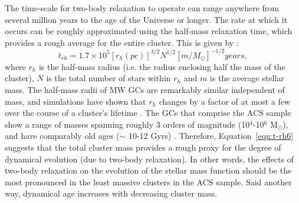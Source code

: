 The time-scale for two-body relaxation to operate can range anywhere from
several million years to the age of the Universe or longer.  The rate
at which it occurs can be roughly approximated using the half-mass
relaxation time, which provides a rough average for the entire
cluster.  This is given by \citep{spitzer87}:  
\begin{equation}
\label{eqn:t-rh6}
t_{rh} = 1.7 \times 10^5[r_h(pc)]^{3/2}N^{1/2}[m/M_{\odot}]^{-1/2}
years,
\end{equation}
where $r_h$ is the half-mass radius (i.e. the radius enclosing half
the mass of the cluster), $N$ is the total number of stars
within $r_h$ and $m$ is the average stellar mass.  The half-mass radii
of MW GCs are remarkably similar independent of 
mass, and simulations have shown that $r_h$ changes by a factor of at
most a few
over the course of a cluster's lifetime \citep{henon73, murray09}.
The GCs that comprise the ACS sample show a range of masses spanning
roughly 3 orders of magnitude (10$^4$-10$^6$ M$_{\odot}$), and have
comparably old ages ($\sim$ 10-12 Gyrs) \citep{deangeli05}.  
Therefore, Equation~\ref{eqn:t-rh6} suggests that the total cluster
mass provides a rough proxy for the degree of
dynamical evolution (due to two-body relaxation).  In other words, the
effects of two-body relaxation on the evolution of 
the stellar mass function should be the most pronounced in the least
massive clusters in the ACS sample.  Said another way, dynamical
age increases with decreasing cluster mass.

